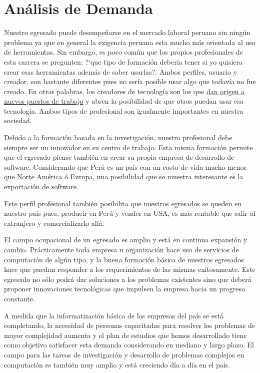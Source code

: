 \section{Análisis de Demanda}\label{sec:cs-analisis-de-demanda}
Nuestro egresado puede desempeñarse en el mercado laboral peruano sin ningún problema ya que en general la exigencia peruana esta mucho más orientada al uso de herramientas. Sin embargo, es poco común que los propios profesionales de esta carrera se pregunten: ?`que tipo de formación debería tener si yo quisiera crear esas herramientas además de saber usarlas?. Ambos perfiles, usuario y creador, son bastante diferentes pues no sería posible usar algo que todavía no fue creado. En otras palabras, los creadores de tecnología son los que \underline{dan origen a nuevos puestos de trabajo} y abren la posibilidad de que otros puedan usar esa tecnología. Ambos tipos de profesional son igualmente importantes en nuestra sociedad.

Debido a la formación basada en la investigación, nuestro profesional debe siempre ser un innovador en su centro de trabajo. Esta misma formación permite que el egresado piense también en crear su propia empresa de desarrollo de software. Considerando que Perú es un país con un costo de vida mucho menor que Norte América ó Europa, una posibilidad que se muestra interesante es la exportación de software.

Este perfil profesional también posibilita que nuestros egresados se queden en nuestro país pues, producir en Perú y vender en USA, es más rentable que salir al extranjero y comercializarlo allá.

El campo ocupacional de un egresado es amplio y está en continua expansión y cambio. Prácticamente toda empresa u organización hace uso de servicios de computación de algún tipo, y la buena formación básica de nuestros egresados hace que puedan responder a los requerimientos de las mismas exitosamente. Este egresado no sólo podrá dar soluciones a los problemas existentes sino que deberá proponer innovaciones tecnológicas que impulsen la empresa hacia un progreso constante.

A medida que la informatización básica de las empresas del país se está completando, la necesidad de personas capacitadas para resolver los problemas de mayor complejidad aumenta y el plan de estudios que hemos desarrollado tiene como objetivo satisfacer esta demanda considerando en mediano y largo plazo. El campo para las tareas de investigación y desarrollo de problemas complejos en computación es también muy amplio y está creciendo día a día en el país. 


